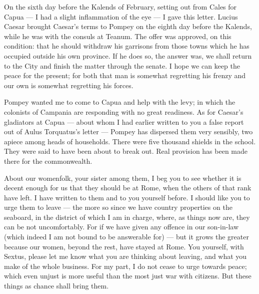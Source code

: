 

 On the sixth day before the Kalends of February, setting out from Cales for Capua --- I had a slight inflammation of the eye --- I gave this letter. Lucius Caesar brought Caesar's terms to Pompey on the eighth day before the Kalends, while he was with the consuls at Teanum. The offer was approved, on this condition: that he should withdraw his garrisons from those towns which he has occupied outside his own province. If he does so, the answer was, we shall return to the City and finish the matter through the senate. I hope we can keep the peace for the present; for both that man is somewhat regretting his frenzy and our own is somewhat regretting his forces.

 Pompey wanted me to come to Capua and help with the levy; in which the colonists of Campania are responding with no great readiness. As for Caesar's gladiators at Capua --- about whom I had earlier written to you a false report out of Aulus Torquatus's letter --- Pompey has dispersed them very sensibly, two apiece among heads of households. There were five thousand shields in the school. They were said to have been about to break out. Real provision has been made there for the commonwealth.

 About our womenfolk, your sister among them, I beg you to see whether it is decent enough for us that they should be at Rome, when the others of that rank have left. I have written to them and to you yourself before. I should like you to urge them to leave --- the more so since we have country properties on the seaboard, in the district of which I am in charge, where, as things now are, they can be not uncomfortably. For if we have given any offence in our son-in-law (which indeed I am not bound to be answerable for) --- but it grows the greater because our women, beyond the rest, have stayed at Rome. You yourself, with Sextus, please let me know what you are thinking about leaving, and what you make of the whole business. For my part, I do not cease to urge towards peace; which even unjust is more useful than the most just war with citizens. But these things as chance shall bring them.
